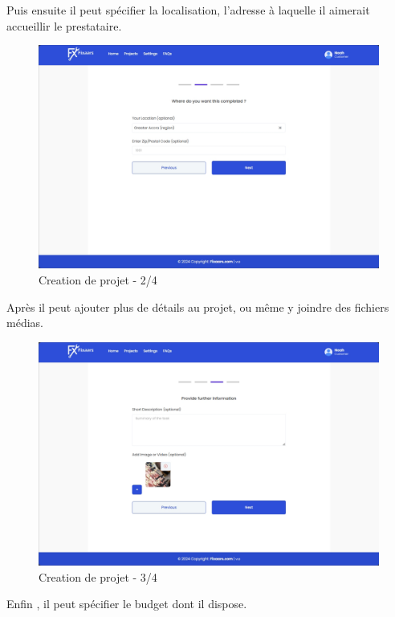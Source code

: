 Puis ensuite il peut spécifier la localisation, l'adresse à laquelle il aimerait accueillir le prestataire.

\vspace{0.35cm}
\begin{figure}[H]
\begin{center}
\includegraphics[width=12cm]{assets/demo/setup-2.png}
\end{center}
\caption{Creation de projet - 2/4}
\end{figure}

Après il peut ajouter plus de détails au projet, ou même y joindre des fichiers médias.

\vspace{0.35cm}
\begin{figure}[H]
\begin{center}
\includegraphics[width=12cm]{assets/demo/setup-3.png}
\end{center}
\caption{Creation de projet - 3/4}
\end{figure}

Enfin , il peut spécifier le budget dont il dispose.

